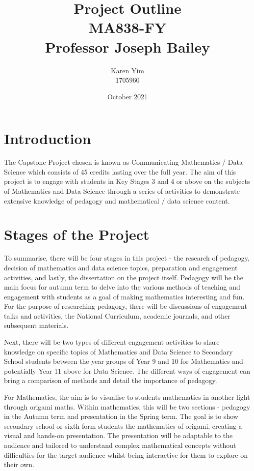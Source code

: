 \documentclass{article}
\title{ Project Outline \\{\Large MA838-FY}\\{\Large Professor Joseph Bailey} }
\author{Karen Yim \\ 1705960 }
\date{October 2021}
\begin{document}
\maketitle

\section{Introduction}
The Capstone Project chosen is known as Communicating Mathematics / Data Science which consists of 45 credits lasting over the full year. The aim of this project is to engage with students in Key Stages 3 and 4 or above on the subjects of Mathematics and Data Science through a series of activities to demonstrate extensive knowledge of pedagogy and mathematical / data science content.

\section{Stages of the Project}
To summarise, there will be four stages in this project - the research of pedagogy, decision of mathematics and data science topics, preparation and engagement activities, and lastly, the dissertation on the project itself. Pedagogy will be the main focus for autumn term to delve into the various methods of teaching and engagement with students as a goal of making mathematics interesting and fun. For the purpose of researching pedagogy, there will be discussions of engagement talks and activities, the National Curriculum, academic journals, and other subsequent materials.

Next, there will be two types of different engagement activities to share knowledge on specific topics of Mathematics and Data Science to Secondary School students between the year groups of Year 9 and 10 for Mathematics and potentially Year 11 above for Data Science. The different ways of engagement can bring a comparison of methods and detail the importance of pedagogy.

For Mathematics, the aim is to visualise to students mathematics in another light through origami maths. Within mathematics, this will be two sections - pedagogy in the Autumn term and presentation in the Spring term. The goal is to show secondary school or sixth form students the mathematics of origami, creating a visual and hands-on presentation. The presentation will be adaptable to the audience and tailored to understand complex mathematical concepts without difficulties for the target audience whilst being interactive for them to explore on their own.
\end{document}
